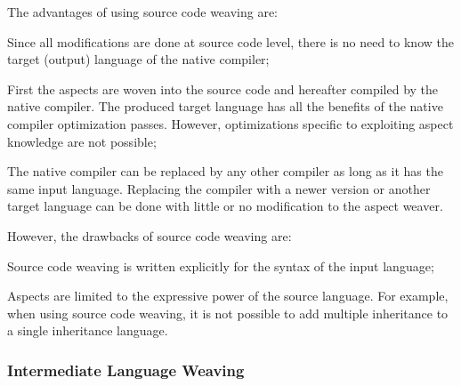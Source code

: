 The advantages of using source code weaving are:
\begin{description}[style=nextline,noitemsep]
  \item[High-level source modification] Since all modifications are done at source code level, there is no need to know the target (output) language of the native compiler;
  \item[Aspect and original source optimization] First the aspects are woven into the source code and hereafter compiled by the native compiler.
       The produced target language has all the benefits of the native compiler optimization passes.
       However, optimizations specific to exploiting aspect knowledge are not possible;
  \item[Native compiler portability] The native compiler can be replaced by any other compiler as long as it has the same input language.
       Replacing the compiler with a newer version or another target language can be done with little or no modification to the aspect weaver.
\end{description}

However, the drawbacks of source code weaving are:
\begin{description}[style=nextline,noitemsep]
  \item[Language dependency] Source code weaving is written explicitly for the syntax of the input language;
  \item[Limited expressiveness] Aspects are limited to the expressive power of the source language.
       For example, when using source code weaving, it is not possible to add multiple inheritance to a single inheritance language.
\end{description}

\subsubsection{Intermediate Language Weaving}
\label{sec:intermediate_language_weaving}


